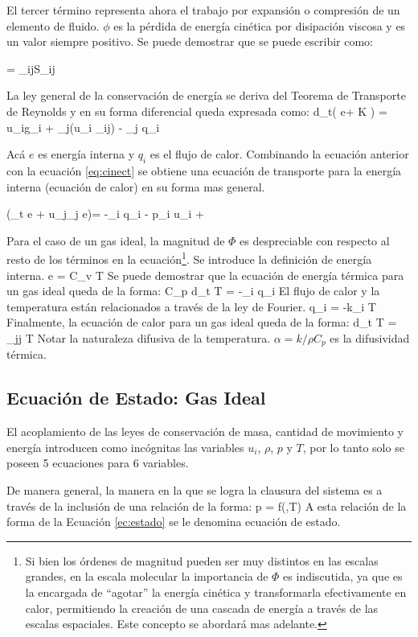 El tercer término representa ahora el trabajo por expansión o compresión de un elemento de fluido. $\phi$ es la pérdida de energía cinética por disipación viscosa y es un valor siempre positivo. Se puede demostrar que se puede escribir como:

\be 
\Phi = \tau_{ij}S_{ij}
\ee

La ley general de la conservación de energía se deriva del Teorema de Transporte de Reynolds y en su forma diferencial queda expresada como:
\be 
\rho d_t\left( e+ K \right) = u_i\rho g_i + \partial_j(u_i \sigma_{ij}) - \partial_j q_i
\ee

Acá $e$ es energía interna y $q_i$ es el flujo de calor. Combinando la ecuación anterior con la ecuación \ref{eq:cinect} se obtiene una ecuación de transporte para la energía interna (ecuación de calor) en su forma mas general.

\be \label{eq:energia_e}
\rho\left(\partial_t e + u_j\partial_j e\right)= -\partial_i q_i - p\partial_i u_i + \Phi
\ee

Para el caso de un gas ideal, la magnitud de $\Phi$ es despreciable con respecto al resto de los términos en la ecuación\footnote{Si bien los órdenes de magnitud pueden ser muy distintos en las escalas grandes, en la escala molecular la importancia de $\Phi$ es indiscutida, ya que es la encargada de ``agotar'' la energía cinética y transformarla efectivamente en calor, permitiendo la creación de una cascada de energía a través de las escalas espaciales. Este concepto se abordará mas adelante.}. Se introduce la definición de energía interna.
\be 
e = C_v T
\ee
Se puede demostrar que la ecuación de energía térmica para un gas ideal queda de la forma:
\be 
\rho C_p d_t T = -\partial_i q_i
\ee
El flujo de calor y la temperatura están relacionados a través de la ley de Fourier.
\be 
q_i = -k\partial_i T
\ee
Finalmente, la ecuación de calor para un gas ideal queda de la forma:
\be 
d_t T = \alpha \partial_{jj} T
\ee
Notar la naturaleza difusiva de la temperatura. $\alpha = k/\rho C_p$ es la difusividad térmica.
\subsection{Ecuación de Estado: Gas Ideal}
El acoplamiento de las leyes de conservación de masa, cantidad de movimiento y energía introducen como incógnitas las variables $u_i$, $\rho$, $p$ y $T$, por lo tanto solo se poseen 5 ecuaciones para 6 variables. 

De manera general, la manera en la que se logra la clausura del sistema es a través de la inclusión de una relación de la forma:
\be\label{ec:estado}
p = f(\rho,T)
\ee 
A esta relación de la forma de la Ecuación \ref{ec:estado} se le denomina ecuación de estado.

